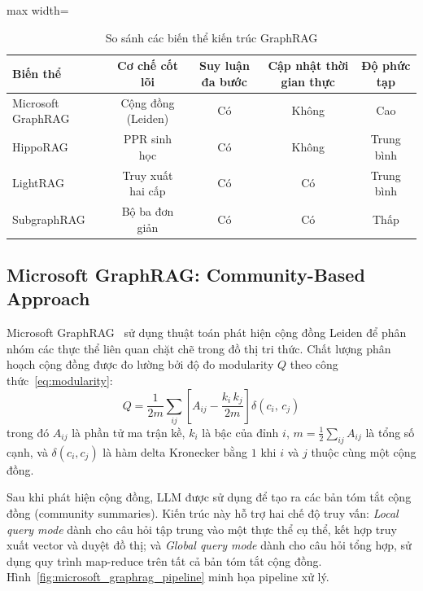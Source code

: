\documentclass[12pt,a4paper]{report}
\theoremstyle{plain}
\theoremstyle{definition}
\begin{document}
	\begin{table}[htbp]
		\centering
		\caption{So sánh các biến thể kiến trúc GraphRAG}
		\label{tab:graphrag_variants_comparison}
		\begin{adjustbox}{max width=\linewidth}
			\begin{tabular}{lcccc}
				\toprule
				\textbf{Biến thể}
				& \textbf{Cơ chế cốt lõi}
				& \textbf{Suy luận đa bước}
				& \textbf{Cập nhật thời gian thực}
				& \textbf{Độ phức tạp}         \\
				\midrule
				Microsoft GraphRAG & Cộng đồng (Leiden) & Có & Không & Cao         \\
				HippoRAG           & PPR sinh học       & Có & Không & Trung bình  \\
				LightRAG           & Truy xuất hai cấp  & Có & Có    & Trung bình  \\
				SubgraphRAG        & Bộ ba đơn giản     & Có & Có    & Thấp        \\
				\bottomrule
			\end{tabular}
		\end{adjustbox}
	\end{table}
	
	\subsection{Microsoft GraphRAG: Community-Based Approach}
	\label{subsec:microsoft_graphrag}
	
	Microsoft GraphRAG~\cite{edge2024local} sử dụng thuật toán phát hiện cộng đồng
	Leiden để phân nhóm các thực thể liên quan chặt chẽ trong đồ thị tri thức. Chất
	lượng phân hoạch cộng đồng được đo lường bởi độ đo modularity $Q$ theo
	công thức~\eqref{eq:modularity}:
	\begin{equation}
		Q = \frac{1}{2m}
		\sum_{ij}\!\left[
		A_{ij} - \frac{k_i\,k_j}{2m}
		\right]\delta(c_i,\,c_j)
		\label{eq:modularity}
	\end{equation}
	trong đó $A_{ij}$ là phần tử ma trận kề, $k_i$ là bậc của đỉnh $i$,
	$m = \frac{1}{2}\sum_{ij}A_{ij}$ là tổng số cạnh, và $\delta(c_i, c_j)$ là
	hàm delta Kronecker bằng $1$ khi $i$ và $j$ thuộc cùng một cộng đồng.
	
	Sau khi phát hiện cộng đồng, LLM được sử dụng để tạo ra các bản tóm tắt cộng
	đồng (community summaries). Kiến trúc này hỗ trợ hai chế độ truy vấn:
	\emph{Local query mode} dành cho câu hỏi tập trung vào một thực thể cụ thể,
	kết hợp truy xuất vector và duyệt đồ thị; và \emph{Global query mode} dành cho
	câu hỏi tổng hợp, sử dụng quy trình map-reduce trên tất cả bản tóm tắt cộng
	đồng. Hình~\ref{fig:microsoft_graphrag_pipeline} minh họa pipeline xử lý.
	
\end{document}
